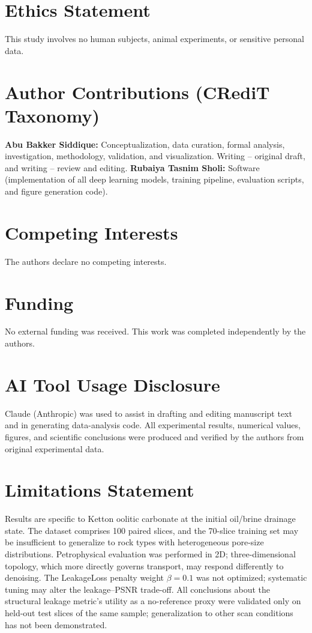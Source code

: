 \documentclass[review,12pt]{elsarticle}
\begin{document}
\section*{Ethics Statement}
This study involves no human subjects, animal experiments, or sensitive
personal data.

\section*{Author Contributions (CRediT Taxonomy)}
\textbf{Abu Bakker Siddique:} Conceptualization, data curation, formal
analysis, investigation, methodology, validation, and visualization.
Writing -- original draft, and writing -- review and editing.
\textbf{Rubaiya Tasnim Sholi:} Software (implementation of all deep
learning models, training pipeline, evaluation scripts, and figure
generation code).

\section*{Competing Interests}
The authors declare no competing interests.

\section*{Funding}
No external funding was received.  This work was completed
independently by the authors.

\section*{AI Tool Usage Disclosure}
Claude (Anthropic) was used to assist in drafting and editing manuscript
text and in generating data-analysis code.  All experimental results,
numerical values, figures, and scientific conclusions were produced and
verified by the authors from original experimental data.

\section*{Limitations Statement}
Results are specific to Ketton oolitic carbonate at the initial
oil/brine drainage state.  The dataset comprises 100 paired slices, and
the 70-slice training set may be insufficient to generalize to rock types
with heterogeneous pore-size distributions.  Petrophysical evaluation
was performed in 2D; three-dimensional topology, which more directly
governs transport, may respond differently to denoising.  The
LeakageLoss penalty weight $\beta = 0.1$ was not optimized; systematic
tuning may alter the leakage--PSNR trade-off.  All conclusions about the
structural leakage metric's utility as a no-reference proxy were
validated only on held-out test slices of the same sample; generalization
to other scan conditions has not been demonstrated.
\end{document}
